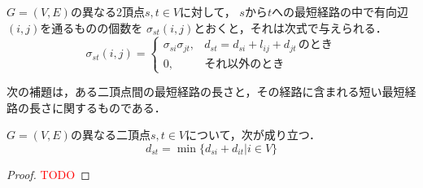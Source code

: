 \begin{lemma}
  $G=(V,E)$の異なる2頂点$s,t \in V$に対して，
  $s$から$t$への最短経路の中で有向辺$(i,j)$を通るものの個数を
  $\sigma_{st}(i,j)$とおくと，それは次式で与えられる．
  \begin{equation*}
    \sigma_{st}(i,j)=
    \left\{
    \begin{array}{ll}
      \sigma_{si} \sigma_{jt}, & d_{st}=d_{si}+l_{ij}+d_{jt}\,\mbox{のとき} \\
      0, & \mbox{それ以外のとき}
    \end{array}
    \right.
  \end{equation*}
  \label{lemma:4}
\end{lemma}

次の補題は，ある二頂点間の最短経路の長さと，その経路に含まれる短い最短経路の長さに関するものである．
\begin{lemma}
  \label{lemma:distance-of-path}
  $G=(V,E)$の異なる二頂点$s,t\in V$について，次が成り立つ．
  \begin{equation*}
    d_{st}=\min\{d_{si}+d_{it}|i\in V\}
  \end{equation*}
\end{lemma}
\begin{proof}
  \textcolor{red}{TODO}
\end{proof}

